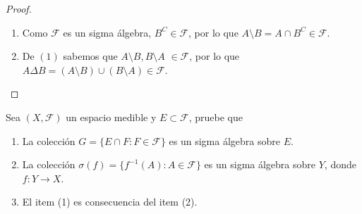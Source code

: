 \begin{proof}
  \begin{enumerate}
    \item Como $\mathcal{F}$ es un sigma \'algebra, $B^C \in \mathcal{F}$, por lo que $A \setminus B = A \cap B^C \in \mathcal{F}$.
    \item De $(1)$ sabemos que $A \setminus B, B \setminus A$ $\in \mathcal{F}$, por lo que $A \Delta B = (A \setminus B) \cup (B \setminus A) \in \mathcal{F}$. 
  \end{enumerate}
\end{proof}

\begin{statement}{2}
  Sea $(X, \mathcal{F})$ un espacio medible y $E \subset \mathcal{F}$, pruebe que
  \begin{enumerate}
    \item La colecci\'on $G = \{E \cap F : F \in \mathcal{F}\}$ es un sigma \'algebra sobre $E$.
    \item La colecci\'on $\sigma(f) = \{f^{-1}(A) : A \in \mathcal{F}\}$ es un sigma \'algebra sobre $Y$, donde $f: Y \to X$.
    \item El item (1) es consecuencia del item (2).
  \end{enumerate}
\end{statement}

